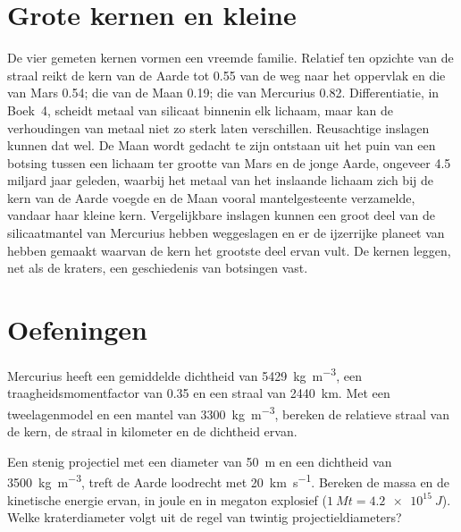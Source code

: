 \section{Grote kernen en kleine}\label{sec:b3:planetary-interiors-surfaces:cores}

De vier gemeten kernen vormen een vreemde familie. Relatief ten opzichte van de straal reikt de
kern van de Aarde tot 0.55 van de weg naar het oppervlak en die van Mars 0.54; die van de
Maan 0.19; die van Mercurius 0.82. Differentiatie, in Boek~4, scheidt
metaal van silicaat binnenin elk lichaam, maar kan de verhoudingen van
metaal niet zo sterk laten verschillen. Reusachtige inslagen kunnen dat wel. De Maan wordt
gedacht te zijn ontstaan uit het puin van een botsing tussen een lichaam ter grootte van Mars en de
jonge Aarde, ongeveer 4.5 miljard jaar geleden, waarbij het metaal van het inslaande lichaam
zich bij de kern van de Aarde voegde en de Maan vooral mantelgesteente verzamelde, vandaar haar
kleine kern. Vergelijkbare inslagen kunnen een groot deel van de silicaatmantel
van Mercurius hebben weggeslagen en er de ijzerrijke planeet van hebben gemaakt waarvan de kern
het grootste deel ervan vult. De kernen leggen, net als de kraters, een geschiedenis van botsingen vast.

\section{Oefeningen}

\begin{exercise}[$\star$]\label{exo:b3:planetary-interiors-surfaces:1}
Mercurius heeft een gemiddelde dichtheid van \qty{5429}{kg.m^{-3}}, een traagheidsmomentfactor
van 0.35 en een straal van \qty{2440}{km}. Met een tweelagenmodel en een
mantel van \qty{3300}{kg.m^{-3}}, bereken de relatieve straal van de kern,
de straal in kilometer en de dichtheid ervan.
\end{exercise}

\begin{exercise}[$\star$]\label{exo:b3:planetary-interiors-surfaces:2}
Een stenig projectiel met een diameter van \qty{50}{m} en een dichtheid van \qty{3500}{kg.m^{-3}},
treft de Aarde loodrecht met \qty{20}{km.s^{-1}}. Bereken de massa en
de kinetische energie ervan, in joule en in megaton explosief
($\qty{1}{Mt} = \qty{4.2e15}{J}$). Welke kraterdiameter volgt uit de regel van
twintig projectieldiameters?
\end{exercise}

